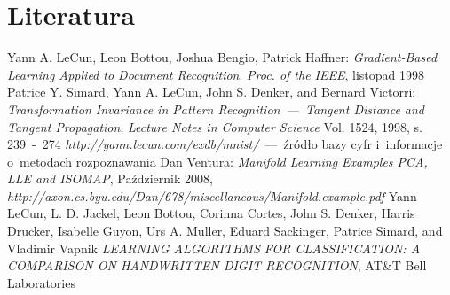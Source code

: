 \documentclass[12pt]{article}
\begin{document}
\section{Literatura}
\renewcommand*{\refname}{}
\begin{thebibliography}{9}
    Yann A. LeCun, Leon Bottou, Joshua Bengio, Patrick Haffner: \emph{Gradient-Based Learning Applied to Document Recognition}. \emph{Proc. of the IEEE}, listopad 1998
     Patrice Y. Simard, Yann A. LeCun, John S. Denker, and Bernard Victorri: \emph{Transformation Invariance in Pattern Recognition~---~Tangent Distance and Tangent Propagation}. \emph{Lecture Notes in Computer Science} Vol. 1524, 1998, s. 239~-~274
    \emph{http://yann.lecun.com/exdb/mnist/}~---~źródło bazy cyfr i~informacje o~metodach rozpoznawania
     Dan Ventura: \emph{Manifold Learning Examples PCA, LLE and ISOMAP}, Październik 2008, \emph{http://axon.cs.byu.edu/Dan/678/miscellaneous/Manifold.example.pdf}
     Yann LeCun, L. D. Jackel, Leon Bottou, Corinna Cortes, John S. Denker, Harris Drucker, Isabelle Guyon, Urs A. Muller, Eduard Sackinger, Patrice Simard, and Vladimir Vapnik \emph{LEARNING ALGORITHMS FOR CLASSIFICATION:
A COMPARISON ON HANDWRITTEN DIGIT RECOGNITION}, AT&T Bell Laboratories

\end{thebibliography}
\end{document}
